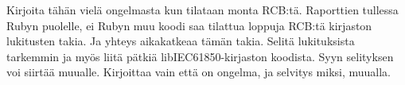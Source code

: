 \begin{it}
	Kirjoita tähän vielä ongelmasta kun tilataan monta RCB:tä. Raporttien tullessa Rubyn puolelle, ei Rubyn muu koodi saa tilattua loppuja RCB:tä kirjaston lukitusten takia. Ja yhteys aikakatkeaa tämän takia. Selitä lukituksista tarkemmin ja myös liitä pätkiä libIEC61850-kirjaston koodista. Syyn selityksen voi siirtää muualle. Kirjoittaa vain että on ongelma, ja selvitys miksi, muualla.
\end{it}